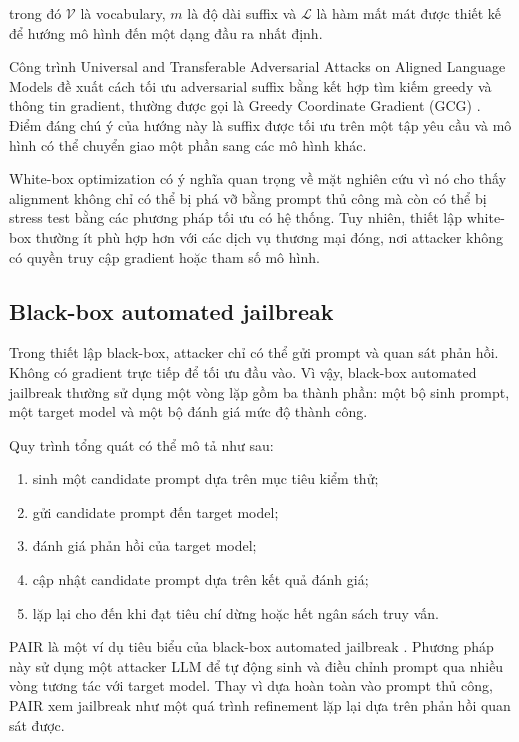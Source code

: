 trong đó $\mathcal{V}$ là vocabulary, $m$ là độ dài suffix và
$\mathcal{L}$ là hàm mất mát được thiết kế để hướng mô hình đến một dạng
đầu ra nhất định.

Công trình Universal and Transferable Adversarial Attacks on Aligned
Language Models đề xuất cách tối ưu adversarial suffix bằng kết hợp tìm
kiếm greedy và thông tin gradient, thường được gọi là Greedy Coordinate
Gradient (GCG) \cite{zou2023universal}. Điểm đáng chú ý của hướng này là
suffix được tối ưu trên một tập yêu cầu và mô hình có thể chuyển giao một
phần sang các mô hình khác.

White-box optimization có ý nghĩa quan trọng về mặt nghiên cứu vì nó cho
thấy alignment không chỉ có thể bị phá vỡ bằng prompt thủ công mà còn có
thể bị stress test bằng các phương pháp tối ưu có hệ thống. Tuy nhiên,
thiết lập white-box thường ít phù hợp hơn với các dịch vụ thương mại đóng,
nơi attacker không có quyền truy cập gradient hoặc tham số mô hình.

\subsection{Black-box automated jailbreak}
\label{subsec:black-box-automated-jailbreak}

Trong thiết lập black-box, attacker chỉ có thể gửi prompt và quan sát phản
hồi. Không có gradient trực tiếp để tối ưu đầu vào. Vì vậy, black-box
automated jailbreak thường sử dụng một vòng lặp gồm ba thành phần: một
bộ sinh prompt, một target model và một bộ đánh giá mức độ thành công.

Quy trình tổng quát có thể mô tả như sau:

\begin{enumerate}[leftmargin=1.2cm]
    \item sinh một candidate prompt dựa trên mục tiêu kiểm thử;
    \item gửi candidate prompt đến target model;
    \item đánh giá phản hồi của target model;
    \item cập nhật candidate prompt dựa trên kết quả đánh giá;
    \item lặp lại cho đến khi đạt tiêu chí dừng hoặc hết ngân sách truy vấn.
\end{enumerate}

PAIR là một ví dụ tiêu biểu của black-box automated jailbreak
\cite{chao2023pair}. Phương pháp này sử dụng một attacker LLM để tự động
sinh và điều chỉnh prompt qua nhiều vòng tương tác với target model. Thay
vì dựa hoàn toàn vào prompt thủ công, PAIR xem jailbreak như một quá trình
refinement lặp lại dựa trên phản hồi quan sát được.


